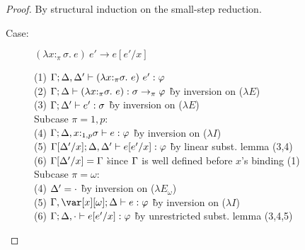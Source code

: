 
\TypePreservationTheorem

\begin{proof}
By structural induction on the small-step reduction.

%

\begin{description}

\item[Case:] $(\lambda x{:}_\pi\sigma.~e)~e' \longrightarrow e[e'/x]$
\begin{tabbing}
    (1) $\Gamma; \Delta, \Delta' \vdash (\lambda x{:}_\pi\sigma.~e)~e' : \varphi$\\
    (2) $\Gamma; \Delta \vdash (\lambda x{:}_\pi\sigma.~e) : \sigma\to_\pi\varphi$ \` by inversion on ($\lambda E$) \\
    (3) $\Gamma; \Delta' \vdash e' : \sigma$ \` by inversion on ($\lambda E$) \\
    Subcase $\pi = 1,p$:\\
    (4) $\Gamma; \Delta,x{:}_{1,p}\sigma \vdash e : \varphi$ \` by inversion on ($\lambda I$) \\
    (5) $\Gamma[\Delta'/x]; \Delta, \Delta' \vdash e[e'/x] : \varphi$ \` by linear subst. lemma (3,4) \\
    (6) $\Gamma[\Delta'/x] = \Gamma$ \` since $\Gamma$ is well defined before $x$'s binding (1)\\
    Subcase $\pi = \omega$:\\
    (4) $\Delta' = \cdot$ \` by inversion on ($\lambda E_\omega$) \\
    (5) $\G, \xo; \D \vdash e : \vp$ \` by inversion on ($\lambda I$)\\
    (6) $\Gamma; \Delta, \cdot \vdash e[e'/x] : \varphi$ \` by unrestricted subst. lemma (3,4,5)\\
\end{tabbing}


\end{description}
\end{proof}
